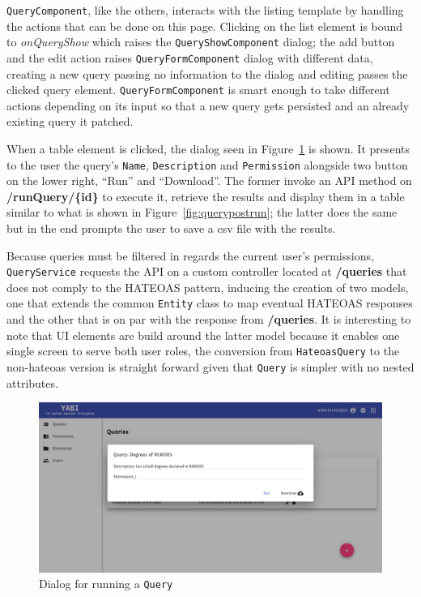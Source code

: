 \texttt{QueryComponent}, like the others, interacts with the listing template by handling the actions that can be done on this page. Clicking on the list element is bound to \textit{onQueryShow} which raises the \texttt{QueryShowComponent} dialog; the add button and the edit action raises \texttt{QueryFormComponent} dialog with different data, creating a new query passing no information to the dialog and editing passes the clicked query element. \texttt{QueryFormComponent} is smart enough to take different actions depending on its input so that a new query gets persisted and an already existing query it patched.

When a table element is clicked, the dialog seen in Figure~\ref{fig:queryprerun} is shown. It presents to the user the query's \texttt{Name}, \texttt{Description} and \texttt{Permission} alongside two button on the lower right, ``Run'' and ``Download''. The former invoke an \gls{API} method on \textbf{/runQuery/\{id\}} to execute it, retrieve the results and display them in a table similar to what is shown in Figure~\ref{fig:querypostrun}; the latter does the same but in the end prompts the user to save a \gls{csv} file with the results. 

Because queries must be filtered in regards the current user's permissions, \texttt{QueryService} requests the \gls{API} on a custom controller located at \textbf{/queries} that does not comply to the \gls{HATEOAS} pattern, inducing the creation of two models, one that extends the common \texttt{Entity} class to map eventual \gls{HATEOAS} responses and the other that is on par with the response from \textbf{/queries}. It is interesting to note that \gls{UI} elements are build around the latter model because it enables one single screen to serve both user roles, the conversion from \texttt{HateoasQuery} to the non-hateoas version is straight forward given that \texttt{Query} is simpler with no nested attributes.

\begin{figure}
  \centering
  \includegraphics[width=.8\textwidth]{images/screenshots/query/query-pre-run}
  \caption{Dialog for running a \texttt{Query}}\label{fig:queryprerun}
\end{figure}

